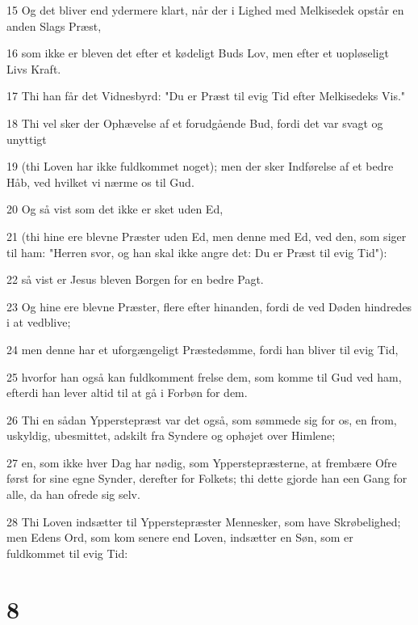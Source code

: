 \par 15 Og det bliver end ydermere klart, når der i Lighed med Melkisedek opstår en anden Slags Præst,
\par 16 som ikke er bleven det efter et kødeligt Buds Lov, men efter et uopløseligt Livs Kraft.
\par 17 Thi han får det Vidnesbyrd: "Du er Præst til evig Tid efter Melkisedeks Vis."
\par 18 Thi vel sker der Ophævelse af et forudgående Bud, fordi det var svagt og unyttigt
\par 19 (thi Loven har ikke fuldkommet noget); men der sker Indførelse af et bedre Håb, ved hvilket vi nærme os til Gud.
\par 20 Og så vist som det ikke er sket uden Ed,
\par 21 (thi hine ere blevne Præster uden Ed, men denne med Ed, ved den, som siger til ham: "Herren svor, og han skal ikke angre det: Du er Præst til evig Tid"):
\par 22 så vist er Jesus bleven Borgen for en bedre Pagt.
\par 23 Og hine ere blevne Præster, flere efter hinanden, fordi de ved Døden hindredes i at vedblive;
\par 24 men denne har et uforgængeligt Præstedømme, fordi han bliver til evig Tid,
\par 25 hvorfor han også kan fuldkomment frelse dem, som komme til Gud ved ham, efterdi han lever altid til at gå i Forbøn for dem.
\par 26 Thi en sådan Ypperstepræst var det også, som sømmede sig for os, en from, uskyldig, ubesmittet, adskilt fra Syndere og ophøjet over Himlene;
\par 27 en, som ikke hver Dag har nødig, som Ypperstepræsterne, at frembære Ofre først for sine egne Synder, derefter for Folkets; thi dette gjorde han een Gang for alle, da han ofrede sig selv.
\par 28 Thi Loven indsætter til Ypperstepræster Mennesker, som have Skrøbelighed; men Edens Ord, som kom senere end Loven, indsætter en Søn, som er fuldkommet til evig Tid:

\chapter{8}

